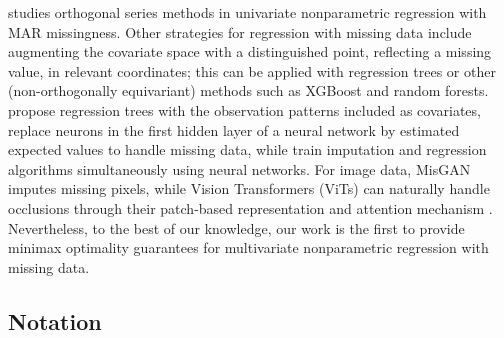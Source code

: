 \documentclass[12pt]{article}
\begin{document}
\citet{efromovich2011nonparametric} studies orthogonal series methods in univariate nonparametric regression with MAR missingness.  Other strategies for regression with missing data include augmenting the covariate space with a distinguished point, reflecting a missing value, in relevant coordinates; this can be applied with regression trees or other (non-orthogonally equivariant) methods such as XGBoost and random forests.  \citet{twala2008good} propose regression trees with the observation patterns included as covariates, \citet{smieja2018processing} replace neurons in the first hidden layer of a neural network by estimated expected values to handle missing data, while \citet{le2021what} train imputation and regression algorithms simultaneously using neural networks.  For image data, MisGAN \citep{li2019misgan} imputes missing pixels, while Vision Transformers (ViTs) can naturally handle occlusions through their patch-based representation and attention mechanism \citep{dosovitskiy2021an, bao2022beit, he2022masked}.  Nevertheless, to the best of our knowledge, our work is the first to provide minimax optimality guarantees for multivariate nonparametric regression with missing data. 



\subsection{Notation}
\end{document}
